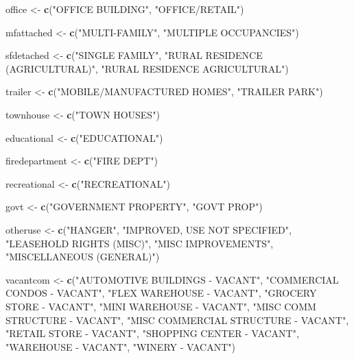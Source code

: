 \documentclass[]{article}
\newenvironment{Shaded}{\begin{snugshade}}{\end{snugshade}}
\newcommand{\KeywordTok}[1]{\textcolor[rgb]{0.13,0.29,0.53}{\textbf{#1}}}
\newcommand{\StringTok}[1]{\textcolor[rgb]{0.31,0.60,0.02}{#1}}
\newcommand{\NormalTok}[1]{#1}
\begin{document}
\begin{Shaded}
\begin{Highlighting}[]
\NormalTok{office <-}\StringTok{ }\KeywordTok{c}\NormalTok{(}\StringTok{"OFFICE BUILDING"}\NormalTok{,}
            \StringTok{"OFFICE/RETAIL"}\NormalTok{)}

\NormalTok{mfattached <-}\StringTok{ }\KeywordTok{c}\NormalTok{(}\StringTok{"MULTI-FAMILY"}\NormalTok{,}
                \StringTok{"MULTIPLE OCCUPANCIES"}\NormalTok{)}

\NormalTok{sfdetached <-}\StringTok{ }\KeywordTok{c}\NormalTok{(}\StringTok{"SINGLE FAMILY"}\NormalTok{,}
                \StringTok{"RURAL RESIDENCE (AGRICULTURAL)"}\NormalTok{,}
                \StringTok{"RURAL RESIDENCE AGRICULTURAL"}\NormalTok{)}

\NormalTok{trailer <-}\StringTok{ }\KeywordTok{c}\NormalTok{(}\StringTok{"MOBILE/MANUFACTURED HOMES"}\NormalTok{,}
             \StringTok{"TRAILER PARK"}\NormalTok{)}

\NormalTok{townhouse <-}\StringTok{ }\KeywordTok{c}\NormalTok{(}\StringTok{"TOWN HOUSES"}\NormalTok{)}

\NormalTok{educational <-}\StringTok{ }\KeywordTok{c}\NormalTok{(}\StringTok{"EDUCATIONAL"}\NormalTok{)}

\NormalTok{firedepartment <-}\StringTok{ }\KeywordTok{c}\NormalTok{(}\StringTok{"FIRE DEPT"}\NormalTok{)}

\NormalTok{recreational <-}\StringTok{ }\KeywordTok{c}\NormalTok{(}\StringTok{"RECREATIONAL"}\NormalTok{)}

\NormalTok{govt <-}\StringTok{ }\KeywordTok{c}\NormalTok{(}\StringTok{"GOVERNMENT PROPERTY"}\NormalTok{,}
          \StringTok{"GOVT PROP"}\NormalTok{)}

\NormalTok{otheruse <-}\StringTok{ }\KeywordTok{c}\NormalTok{(}\StringTok{"HANGER"}\NormalTok{,}
              \StringTok{"IMPROVED, USE NOT SPECIFIED"}\NormalTok{,}
              \StringTok{"LEASEHOLD RIGHTS (MISC)"}\NormalTok{,}
              \StringTok{"MISC IMPROVEMENTS"}\NormalTok{,}
              \StringTok{"MISCELLANEOUS (GENERAL)"}\NormalTok{)}

\NormalTok{vacantcom <-}\StringTok{ }\KeywordTok{c}\NormalTok{(}\StringTok{"AUTOMOTIVE BUILDINGS - VACANT"}\NormalTok{,}
               \StringTok{"COMMERCIAL CONDOS - VACANT"}\NormalTok{,}
               \StringTok{"FLEX WAREHOUSE - VACANT"}\NormalTok{,}
               \StringTok{"GROCERY STORE - VACANT"}\NormalTok{,}
               \StringTok{"MINI WAREHOUSE - VACANT"}\NormalTok{,}
               \StringTok{"MISC COMM STRUCTURE - VACANT"}\NormalTok{,}
               \StringTok{"MISC COMMERCIAL STRUCTURE - VACANT"}\NormalTok{,}
               \StringTok{"RETAIL STORE - VACANT"}\NormalTok{,}
               \StringTok{"SHOPPING CENTER - VACANT"}\NormalTok{,}
               \StringTok{"WAREHOUSE - VACANT"}\NormalTok{,}
               \StringTok{"WINERY - VACANT"}\NormalTok{)}


\end{Highlighting}
\end{Shaded}
\end{document}
